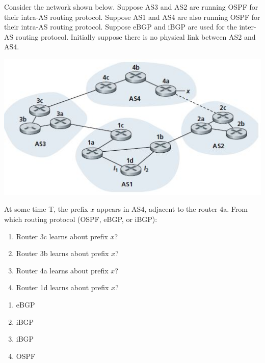 \documentclass{report}
\begin{document}
\clearpage
\begin{problem}
Consider the network shown below. Suppose AS3 and AS2 are running OSPF
for their intra-AS routing protocol. Suppose AS1 and AS4 are also running OSPF
for their intra-AS routing protocol. Suppose eBGP and iBGP are used for the
inter-AS routing protocol. Initially suppose there is no physical link between
AS2 and AS4.

\begin{center}
\includegraphics{hw7-q4}
\end{center}

At some time T, the prefix $x$ appears in AS4, adjacent to the router 4a.
From which routing protocol (OSPF, eBGP, or iBGP):

\begin{enumerate}
\item Router 3c learns about prefix $x$? 
\item Router 3b learns about prefix $x$?
\item Router 4a learns about prefix $x$?
\item Router 1d learns about prefix $x$?
\end{enumerate}

\begin{answer}{10em}

\begin{enumerate}
  \item eBGP
  \item iBGP
  \item iBGP
  \item OSPF
\end{enumerate}

\end{answer}


\end{problem}
\end{document}
